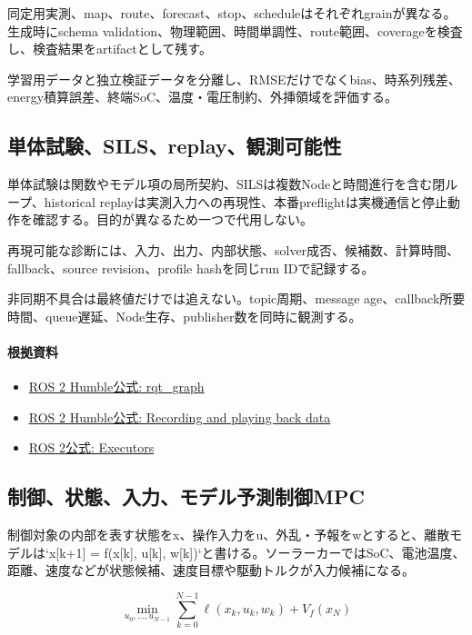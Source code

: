\documentclass[a4paper,11pt]{article}
\begin{document}
同定用実測、map、route、forecast、stop、scheduleはそれぞれgrainが異なる。生成時にschema validation、物理範囲、時間単調性、route範囲、coverageを検査し、検査結果をartifactとして残す。


学習用データと独立検証データを分離し、RMSEだけでなくbias、時系列残差、energy積算誤差、終端SoC、温度・電圧制約、外挿領域を評価する。



\subsection{単体試験、SILS、replay、観測可能性}
単体試験は関数やモデル項の局所契約、SILSは複数Nodeと時間進行を含む閉ループ、historical replayは実測入力への再現性、本番preflightは実機通信と停止動作を確認する。目的が異なるため一つで代用しない。


再現可能な診断には、入力、出力、内部状態、solver成否、候補数、計算時間、fallback、source revision、profile hashを同じrun IDで記録する。


非同期不具合は最終値だけでは追えない。topic周期、message age、callback所要時間、queue遅延、Node生存、publisher数を同時に観測する。

\paragraph{根拠資料}
\begin{itemize}[leftmargin=1.6em]
\item \href{https://docs.ros.org/en/ros2_packages/humble/api/rqt_graph/index.html}{ROS 2 Humble公式: rqt\_graph}
\item \href{https://docs.ros.org/en/humble/Tutorials/Beginner-CLI-Tools/Recording-And-Playing-Back-Data/Recording-And-Playing-Back-Data.html}{ROS 2 Humble公式: Recording and playing back data}
\item \href{https://docs.ros.org/en/rolling/Concepts/Intermediate/About-Executors.html}{ROS 2公式: Executors}
\end{itemize}

\subsection{制御、状態、入力、モデル予測制御MPC}
制御対象の内部を表す状態をx、操作入力をu、外乱・予報をwとすると、離散モデルは`x[k+1] = f(x[k], u[k], w[k])`と書ける。ソーラーカーではSoC、電池温度、距離、速度などが状態候補、速度目標や駆動トルクが入力候補になる。


\[
\min_{u_0,\ldots,u_{N-1}} \sum_{k=0}^{N-1}\ell(x_k,u_k,w_k)+V_f(x_N)
\]
\end{document}
